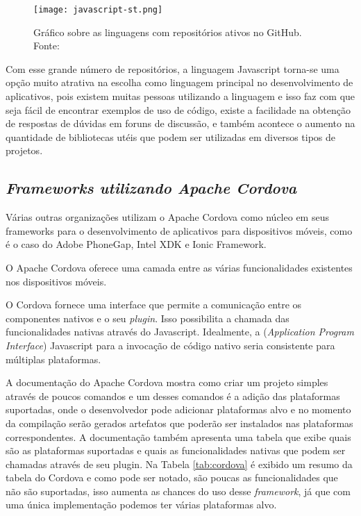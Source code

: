 \begin{figure}[!htb]
	\centering
	\texttt{[image: javascript-st.png]} %
	\caption[Linguagens com maior número de repositórios ativos no GitHub]{Gráfico sobre as linguagens com repositórios ativos no GitHub. Fonte: \cite{githut}}
	\label{fig:javascript}
\end{figure}
\vspace{-3mm}

Com esse grande número de repositórios, a linguagem Javascript torna-se uma opção muito atrativa na escolha como linguagem principal no desenvolvimento de aplicativos, pois existem muitas pessoas utilizando a linguagem e isso faz com que seja fácil de encontrar exemplos de uso de código, existe a facilidade na obtenção de respostas de dúvidas em foruns de discussão, e também acontece o aumento na quantidade de bibliotecas utéis que podem ser utilizadas em diversos tipos de projetos.

\subsection{\normalfont\itshape Frameworks utilizando Apache Cordova}
Várias outras organizações utilizam o Apache Cordova como núcleo em seus frameworks para o desenvolvimento de aplicativos para dispositivos móveis, como é o caso do Adobe PhoneGap, Intel XDK e Ionic Framework.

O Apache Cordova oferece uma camada entre as várias funcionalidades existentes nos dispositivos móveis.
\begin{citacao}
O Cordova fornece uma interface que permite a comunicação entre os componentes nativos e o seu \textit{plugin}. Isso possibilita a chamada das funcionalidades nativas através do Javascript. Idealmente, a  (\textit{Application Program Interface}) Javascript para a invocação de código nativo seria consistente para múltiplas plataformas. \cite{cordova}
\end{citacao}

A documentação do Apache Cordova mostra como criar um projeto simples através de poucos comandos e um desses comandos é a adição das plataformas suportadas, onde o desenvolvedor pode adicionar plataformas alvo e no momento da compilação serão gerados artefatos que poderão ser instalados nas plataformas correspondentes.
A documentação também apresenta uma tabela que exibe quais são as plataformas suportadas e quais as funcionalidades nativas que podem ser chamadas através de seu plugin.
Na Tabela \ref{tab:cordova} é exibido um resumo da tabela do Cordova e como pode ser notado, são poucas as funcionalidades que não são suportadas, isso aumenta as chances do uso desse \textit{framework}, já que com uma única implementação podemos ter várias plataformas alvo.

